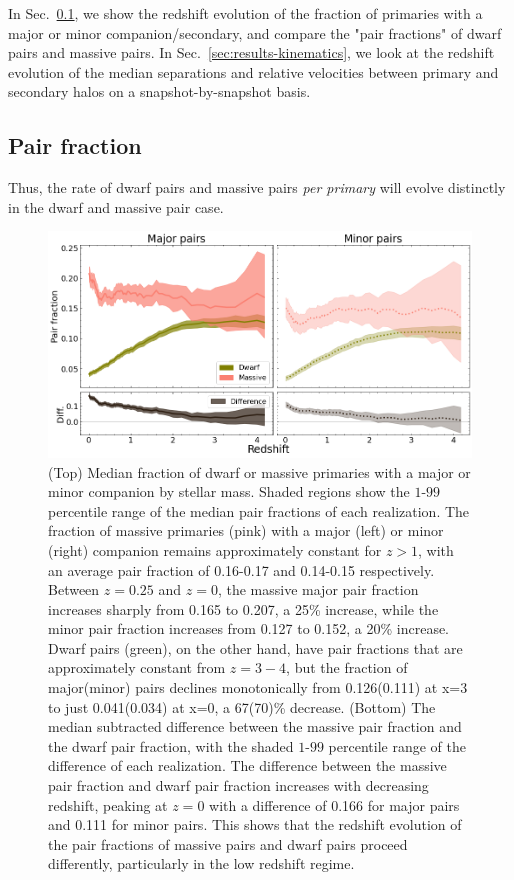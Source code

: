 \documentclass[twocolumn]{aastex631}
\begin{document}
In Sec.~\ref{sec:results-frac}, we show the redshift evolution of the fraction of primaries with a major or minor companion/secondary, and compare the "pair fractions" of dwarf pairs and massive pairs.
In Sec.~\ref{sec:results-kinematics}, we look at the redshift evolution of the median separations and relative velocities between primary and secondary halos on a snapshot-by-snapshot basis.


\subsection{Pair fraction}\label{sec:results-frac}
Thus, the rate of dwarf pairs and massive pairs \textit{per primary} will evolve distinctly in the dwarf and massive pair case.

\label{sec:results}
\begin{figure}[htb]
  \centering
  \includegraphics[width=\textwidth]{pairratio_1000.png}
  \caption{
    (Top) Median fraction of dwarf or massive primaries with a major or minor companion by stellar mass. 
    Shaded regions show the $1$-$99$ percentile range of the median pair fractions of each realization. 
    The fraction of massive primaries (pink) with a major (left) or minor (right) companion remains approximately constant for $z>1$, with an average pair fraction of 0.16-0.17 and 0.14-0.15 respectively. Between $z=0.25$ and $z=0$, the massive major pair fraction increases sharply from 0.165 to 0.207, a 25\% increase, while the minor pair fraction increases from 0.127 to 0.152, a 20\% increase.
    Dwarf pairs (green), on the other hand, have pair fractions that are approximately constant from $z=3-4$, but the fraction of major(minor) pairs declines monotonically from 0.126(0.111) at x=3 to just 0.041(0.034) at x=0, a 67(70)\% decrease. 
  (Bottom) The median subtracted difference between the massive pair fraction and the dwarf pair fraction, with the shaded $1$-$99$ percentile range of the difference of each realization. The difference between the massive pair fraction and dwarf pair fraction increases with decreasing redshift, peaking at $z=0$ with a difference of 0.166 for major pairs and 0.111 for minor pairs. This shows that the redshift evolution of the pair fractions of massive pairs and dwarf pairs proceed differently, particularly in the low redshift regime.}
  \label{fig:pairratio}
\end{figure}
\end{document}
